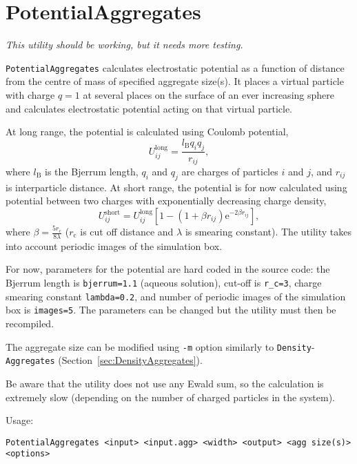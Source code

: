 \section{PotentialAggregates} \label{sec:PotentialAggregates}

{\em This utility should be working, but it needs more testing.}

\texttt{PotentialAggregates} calculates electrostatic potential as a
function of distance from the centre of mass of specified aggregate
size(s). It places a virtual particle with charge $q=1$ at several places
on the surface of an ever increasing sphere and calculates electrostatic
potential acting on that virtual particle.

At long range, the potential is calculated using Coulomb potential,
\begin{equation} \label{eq:Coulomb}
  U_{ij}^{\mathrm{long}} = \frac{l_{\mathrm{B}} q_i q_j}{r_{ij}},
\end{equation}
where $l_{\mathrm{B}}$ is the Bjerrum length, $q_i$ and $q_j$ are charges
of particles $i$ and $j$, and $r_{ij}$ is interparticle distance. At short
range, the potential is for now calculated using potential between two
charges with exponentially decreasing charge density,
\begin{equation} \label{eq:Slater}
  U_{ij}^{\mathrm{short}} = U_{ij}^{\mathrm{long}}\left[1 - \left(1 + \beta
  r_{ij}\right) \mathrm{e}^{-2\beta r_{ij}}\right],
\end{equation}
where $\beta=\frac{5r_{\mathrm{c}}}{8\lambda}$ ($r_{\mathrm{c}}$ is cut off
distance and $\lambda$ is smearing constant). The utility takes into
account periodic images of the simulation box.

For now, parameters for the potential are hard coded in the source code:
the Bjerrum length is \texttt{bjerrum=1.1} (aqueous solution), cut-off is
\texttt{r\_c=3}, charge smearing constant \texttt{lambda=0.2}, and number
of periodic images of the simulation box is \texttt{images=5}. The
parameters can be changed but the utility must then be recompiled.

The aggregate size can be modified using \texttt{-m} option similarly to
\texttt{Density}-\texttt{Aggregates}
(Section~\ref{sec:DensityAggregates}).

Be aware that the utility does not use any Ewald sum, so the calculation is
extremely slow (depending on the number of charged particles in the system).

Usage:

\vspace{1em}
\noindent
\texttt{PotentialAggregates <input> <input.agg> <width> <output> <agg size(s)> <options>}

